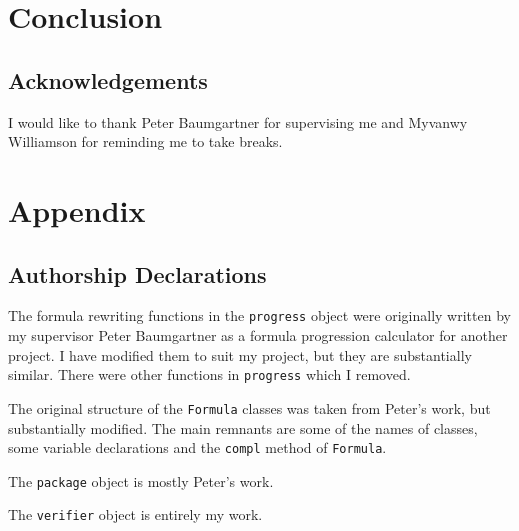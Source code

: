 \documentclass[a4paper]{article}
\begin{document}
\section{Conclusion}
\subsection{Acknowledgements}
I would like to thank Peter Baumgartner for supervising me and Myvanwy Williamson for reminding me to take breaks.

\nocite{*}
\printbibliography{}
\newpage
\section{Appendix}\label{appendix}
\subsection{Authorship Declarations}
The formula rewriting functions in the \texttt{progress} object were originally written by my supervisor Peter Baumgartner as a formula progression calculator for another project. I have modified them to suit my project, but they are substantially similar. There were other functions in \texttt{progress} which I removed.

The original structure of the \texttt{Formula} classes was taken from Peter's work, but substantially modified. The main remnants are some of the names of classes, some variable declarations and the \texttt{compl} method of \texttt{Formula}.

The \texttt{package} object is mostly Peter's work.

The \texttt{verifier} object is entirely my work.
\end{document}
